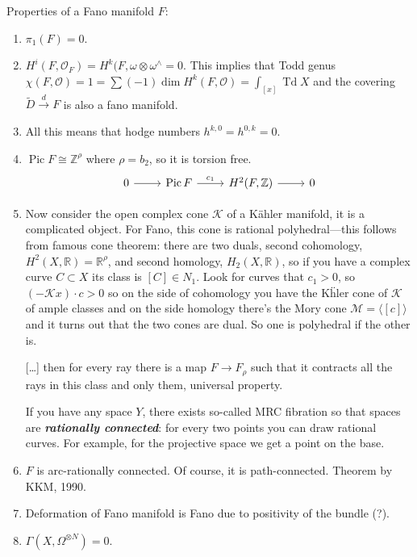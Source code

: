 	Properties of a Fano manifold $F$:
	\begin{enumerate}
		\item $\pi_1(F)=0$.
		\item $H^i(F,\mathcal{O}_F)=H^k(F,\omega\otimes\omega^\wedge=0$. This implies that Todd genus $\chi(F,\mathcal{O})=1=\sum(-1)\dim H^k(F,\mathcal{O})=\int_{[x]}\operatorname{T d} X$ and the covering $\tilde{D}\overset{d}{\to} F$ is also a fano manifold.
		\item All this means that hodge numbers $h^{k,0}=h^{0,k}=0$.
		\item $\operatorname{Pic} F\cong \mathbb{Z}^\rho$ where $\rho=b_2$, so it is torsion free.
		\[\begin{tikzcd}
			0\arrow[r]&\operatorname{Pic} F\arrow[r,"c_1"]&H^2(F,\mathbb{Z})\arrow[r]&0
		\end{tikzcd}\]
		\item Now consider the open complex cone $\mathcal{K}$ of a Kähler manifold, it is a complicated object. For Fano, this cone is rational polyhedral---this follows from famous cone theorem: there are two duals, second cohomology, $H^2(X,\mathbb{R})=\mathbb{R}^\rho$, and second homology, $H_2(X,\mathbb{R})$, so if you have a complex curve $C\subset X$ its class is $[C]\in N_1$. Look for curves that $c_1>0$, so $(-\mathcal{K} x)\cdot c>0$ so on the side of cohomology you have the K\"hler cone of $\mathcal{K}$ of ample classes  and on the side homology there's the Mory cone $\mathcal{M}=\langle[c]\rangle$ and it turns out that the two cones are dual. So one is polyhedral if the other is.
		
		[…] then for every ray there is a map $F\to F_\rho$ such that it contracts all the rays in this class and only them, universal property.
		
		If you have any space $Y$, there exists so-called MRC fibration so that spaces are \textbf{\textit{rationally connected}}: for every two points you can draw rational curves. For example, for the projective space we get a point on the base.
		
		\item $F$ is arc-rationally connected. Of course, it is path-connected. Theorem by KKM, 1990.
		
		\item Deformation of Fano manifold is Fano due to positivity of the bundle (?).
		
		\item $\Gamma(X,\Omega^{\otimes N})=0$.
	\end{enumerate}
	
